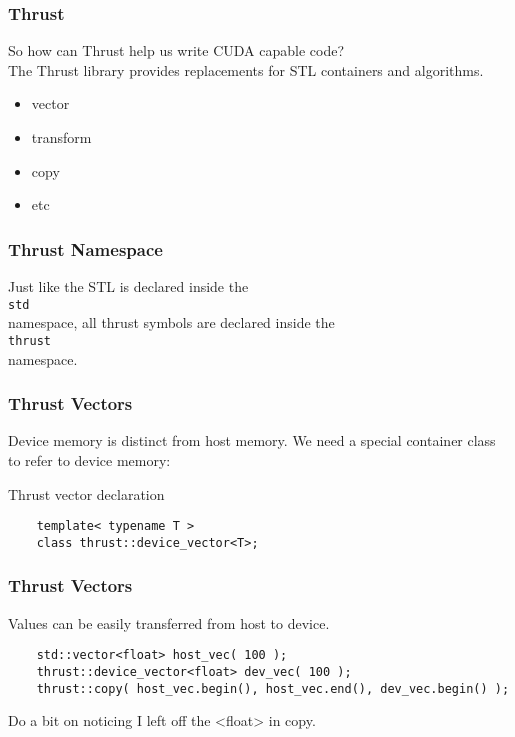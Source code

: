 \begin{frame}
  \frametitle{Thrust}
  So how can Thrust help us write CUDA capable code? \\
  \pause
  The Thrust library provides replacements for STL containers and
  algorithms.
  \pause
  \begin{itemize}
    \item vector
    \item transform
    \item copy
    \item etc
  \end{itemize}
\end{frame}

\begin{frame}[fragile]
  \frametitle{Thrust Namespace}
  Just like the STL is declared inside the \\
  \vspace{.5cm}\hspace{1cm}\lstinline|std|\vspace{.5cm} \\
  namespace, all thrust symbols are declared inside the \\
  \vspace{.5cm}\hspace{1cm}\lstinline|thrust|\vspace{.5cm} \\
  namespace.
\end{frame}

\begin{frame}[fragile]
  \frametitle{Thrust Vectors}
  Device memory is distinct from host memory. We need a special
  container class to refer to device memory:
  \begin{block}{Thrust vector declaration}
    \begin{lstlisting}
    template< typename T >
    class thrust::device_vector<T>;
    \end{lstlisting}
  \end{block}
\end{frame}

\begin{frame}[fragile]
  \frametitle{Thrust Vectors}
  Values can be easily transferred from host to device.
  \begin{example}
    \begin{lstlisting}
    std::vector<float> host_vec( 100 );
    thrust::device_vector<float> dev_vec( 100 );
    thrust::copy( host_vec.begin(), host_vec.end(), dev_vec.begin() );
    \end{lstlisting}
  \end{example}
  Do a bit on noticing I left off the <float> in copy.
\end{frame}

